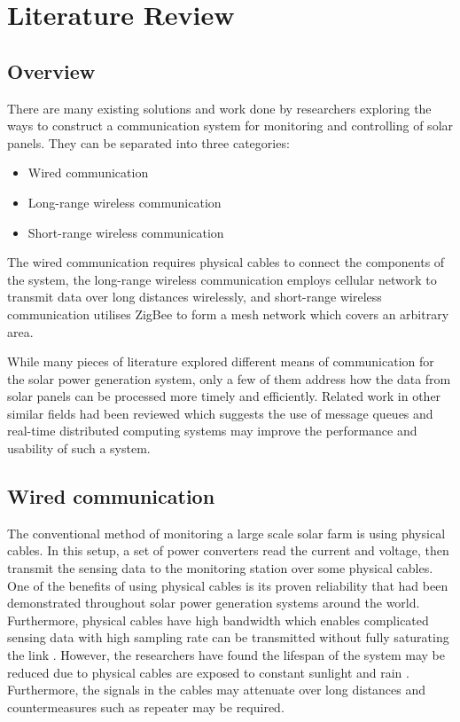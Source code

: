 \documentclass[../thesis.tex]{subfiles}
\begin{document}
\chapter{Literature Review}
\label{chap:litrew}


\section{Overview}
There are many existing solutions and work done by researchers exploring the ways to construct a communication system for monitoring and controlling of solar panels. They can be separated into three categories:

\begin{itemize}
\item Wired communication
\item Long-range wireless communication
\item Short-range wireless communication
\end{itemize}

The wired communication requires physical cables to connect the components of the system, the long-range wireless communication employs cellular network to transmit data over long distances wirelessly, and short-range wireless communication utilises ZigBee to form a mesh network which covers an arbitrary area.

While many pieces of literature explored different means of communication for the solar power generation system, only a few of them address how the data from solar panels can be processed more timely and efficiently. Related work in other similar fields had been reviewed which suggests the use of message queues and real-time distributed computing systems may improve the performance and usability of such a system.


\section{Wired communication}

The conventional method of monitoring a large scale solar farm is using physical cables. In this setup, a set of power converters read the current and voltage, then transmit the sensing data to the monitoring station over some physical cables. One of the benefits of using physical cables is its proven reliability that had been demonstrated throughout solar power generation systems around the world. Furthermore, physical cables have high bandwidth which enables complicated sensing data with high sampling rate can be transmitted without fully saturating the link \cite{SHARIFF20151730}. However, the researchers have found the lifespan of the system may be reduced due to physical cables are exposed to constant sunlight and rain \cite{SHARIFF20151730}. Furthermore, the signals in the cables may attenuate over long distances and countermeasures such as repeater may be required.
\end{document}
